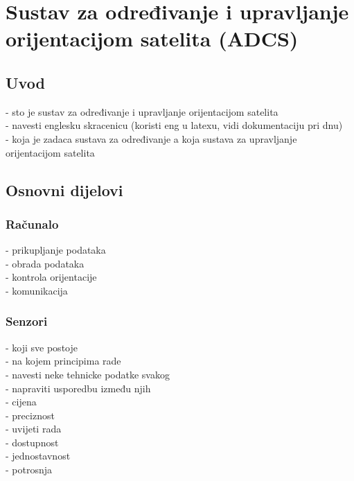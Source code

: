 \documentclass[times, utf8, diplomski, numeric]{templates/template}
\begin{document}
\chapter{Sustav za određivanje i upravljanje orijentacijom satelita (ADCS)}{
    \section{Uvod}{
        - sto je sustav za određivanje i upravljanje orijentacijom satelita\\
            - navesti englesku skracenicu (koristi eng u latexu, vidi dokumentaciju pri dnu)\\
        - koja je zadaca sustava za određivanje a koja sustava za upravljanje orijentacijom satelita\\
    }

    \section{Osnovni dijelovi}{
        \subsection{Računalo}{
            - prikupljanje podataka\\
            - obrada podataka\\
            - kontrola orijentacije\\
            - komunikacija\\
        }

        \subsection{Senzori}{
            - koji sve postoje\\
            - na kojem principima rade\\
            - navesti neke tehnicke podatke svakog\\
            - napraviti usporedbu između njih\\
                - cijena\\
                - preciznost\\
                - uvijeti rada\\
                - dostupnost\\
                - jednostavnost\\
                - potrosnja\\
        }

}}
\end{document}
